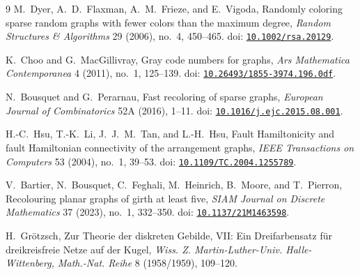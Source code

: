 \documentclass[11pt]{article}
\newcommand{\doi}[1]{doi: \href{https://doi.org/#1}{\nolinkurl{#1}}}
\theoremstyle{remark}
\numberwithin{equation}{section}
\numberwithin{table}{section}
\begin{document}
\begin{thebibliography}{9}
M.~Dyer, A.~D.~Flaxman, A.~M.~Frieze, and E.~Vigoda,
\newblock Randomly coloring sparse random graphs with fewer colors than the maximum degree,
\newblock \emph{Random Structures \& Algorithms} 29 (2006), no.~4, 450--465.
\newblock \doi{10.1002/rsa.20129}.

K.~Choo and G.~MacGillivray,
\newblock Gray code numbers for graphs,
\newblock \emph{Ars Mathematica Contemporanea} 4 (2011), no.~1, 125--139.
\newblock \doi{10.26493/1855-3974.196.0df}.

N.~Bousquet and G.~Perarnau,
\newblock Fast recoloring of sparse graphs,
\newblock \emph{European Journal of Combinatorics} 52A (2016), 1--11.
\newblock \doi{10.1016/j.ejc.2015.08.001}.

H.-C.~Hsu, T.-K.~Li, J.~J.~M.~Tan, and L.-H.~Hsu,
\newblock Fault Hamiltonicity and fault Hamiltonian connectivity of the arrangement graphs,
\newblock \emph{IEEE Transactions on Computers} 53 (2004), no.~1, 39--53.
\newblock \doi{10.1109/TC.2004.1255789}.

V.~Bartier, N.~Bousquet, C.~Feghali, M.~Heinrich, B.~Moore, and T.~Pierron,
\newblock Recolouring planar graphs of girth at least five,
\newblock \emph{SIAM Journal on Discrete Mathematics} 37 (2023), no.~1, 332--350.
\newblock \doi{10.1137/21M1463598}.

H.~Gr\"otzsch,
\newblock Zur Theorie der diskreten Gebilde, VII: Ein Dreifarbensatz f\"ur dreikreisfreie Netze auf der Kugel,
\newblock \emph{Wiss. Z. Martin-Luther-Univ. Halle-Wittenberg, Math.-Nat. Reihe} 8 (1958/1959), 109--120.
\end{thebibliography}
\end{document}
